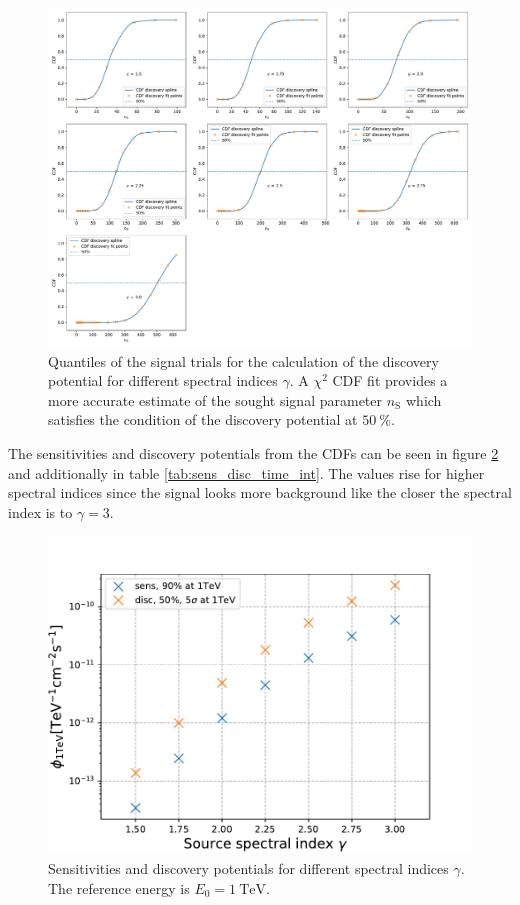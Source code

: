 \begin{figure}
    \centering
    \includegraphics[width=\linewidth]{Plots/05_csky/9_years_gfu_gold_cdf_disc.pdf}
    \caption{Quantiles of the signal trials for the calculation of the discovery potential for different spectral indices $\gamma$. A $\chi^2$ CDF fit provides a more accurate estimate of the sought signal parameter $n_\text{S}$ which satisfies the condition of the discovery potential at $\SI{50}{\percent}$.}
    \label{fig:cdf_disc}
\end{figure}
The sensitivities and discovery potentials from the CDFs can be seen in figure \ref{fig:sens_disc_time_int} and additionally in table \ref{tab:sens_disc_time_int}.
The values rise for higher spectral indices since the signal looks more background like the closer the spectral index is to $\gamma = 3$.
\begin{figure}
    \centering
    \includegraphics[width=\linewidth]{Plots/05_csky/time_int_sens_gfu_gold_9_years_new.pdf}
    \caption{Sensitivities and discovery potentials for different spectral indices $\gamma$. The reference energy is $E_0 = \SI{1}{\tera\electronvolt}$.}
    \label{fig:sens_disc_time_int}
\end{figure}

